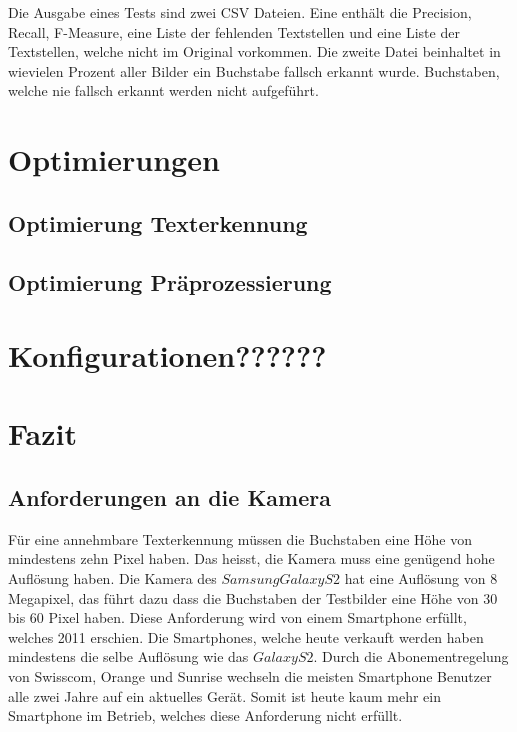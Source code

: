\documentclass[10pt]{article}
\begin{document}
Die Ausgabe eines Tests sind zwei CSV Dateien. Eine enthält die Precision, Recall, F-Measure, eine Liste der fehlenden Textstellen und eine Liste der Textstellen, welche nicht im Original vorkommen.
Die zweite Datei beinhaltet in wievielen Prozent aller Bilder ein Buchstabe fallsch erkannt wurde. Buchstaben, welche nie fallsch erkannt werden nicht aufgeführt.

\section{Optimierungen}

\subsection{Optimierung Texterkennung}

\subsection{Optimierung Präprozessierung}


\section{Konfigurationen??????}

\section{Fazit}

\subsection{Anforderungen an die Kamera}
Für eine annehmbare Texterkennung müssen die Buchstaben eine Höhe von mindestens zehn Pixel haben. Das heisst, die Kamera muss eine genügend hohe Auflösung haben. Die Kamera des $Samsung Galaxy S2$ hat eine Auflösung von 8 Megapixel, das führt dazu dass die Buchstaben der Testbilder eine Höhe von 30 bis 60 Pixel haben. Diese Anforderung wird von einem Smartphone erfüllt, welches 2011 erschien. Die Smartphones, welche heute verkauft werden haben mindestens die selbe Auflösung wie das $Galaxy S2$. Durch die Abonementregelung von Swisscom, Orange und Sunrise wechseln die meisten Smartphone Benutzer alle zwei Jahre auf ein aktuelles Gerät. Somit ist heute kaum mehr ein Smartphone im Betrieb, welches diese Anforderung nicht erfüllt.
\end{document}
